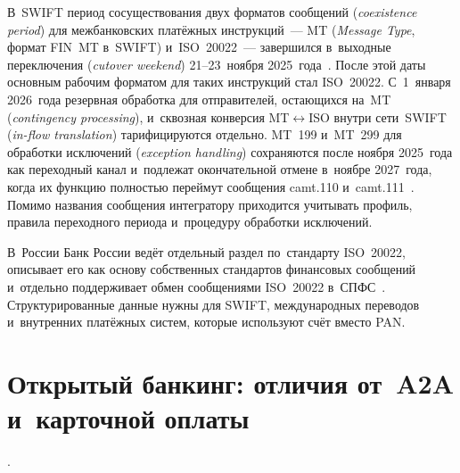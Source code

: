 В~SWIFT период сосуществования двух форматов сообщений
(\textit{coexistence period}) для межбанковских платёжных инструкций~--- MT
(\textit{Message Type}, формат FIN~MT в~SWIFT) и~ISO~20022~--- завершился
в~выходные переключения (\textit{cutover weekend}) 21--23~ноября
2025~года~\cite{swift-iso20022-milestone,swift-iso20022-implementation}.
После этой даты основным рабочим форматом для таких инструкций стал ISO~20022.
С~1~января 2026~года резервная
обработка для отправителей, остающихся на~MT (\textit{contingency processing}),
и~сквозная конверсия MT$\leftrightarrow$ISO внутри сети~SWIFT
(\textit{in-flow translation}) тарифицируются отдельно. MT~199 и~MT~299 для
обработки исключений (\textit{exception handling}) сохраняются после ноября
2025~года как
переходный канал и~подлежат окончательной отмене в~ноябре 2027~года, когда их
функцию полностью переймут сообщения camt.110
и~camt.111~\cite{swift-iso20022-implementation}. Помимо названия сообщения
интегратору приходится учитывать профиль, правила переходного периода
и~процедуру обработки исключений.

В~России Банк России ведёт отдельный раздел по~стандарту ISO~20022, описывает
его как основу собственных стандартов финансовых сообщений и~отдельно
поддерживает обмен сообщениями ISO~20022
в~СПФС~\cite{cbr-iso20022-album,cbr-spfs-iso20022}. Структурированные
данные нужны для SWIFT, международных переводов и~внутренних платёжных систем,
которые используют счёт вместо PAN.

\FloatBarrier
\section{Открытый банкинг: отличия от~A2A и~карточной оплаты}\label{sec:open-banking-boundaries}

.

